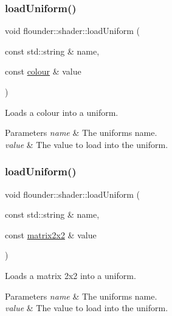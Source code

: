 \subsubsection{\texorpdfstring{load\+Uniform()}{loadUniform()}\hspace{0.1cm}{\footnotesize\ttfamily [7/13]}}
{\footnotesize\ttfamily void flounder\+::shader\+::load\+Uniform (\begin{DoxyParamCaption}\item[{const std\+::string \&}]{name,  }\item[{const \hyperlink{classflounder_1_1colour}{colour} \&}]{value }\end{DoxyParamCaption})}



Loads a colour into a uniform. 


\begin{DoxyParams}{Parameters}
{\em name} & The uniforms name. \\
\hline
{\em value} & The value to load into the uniform. \\
\hline
\end{DoxyParams}
\mbox{\label{classflounder_1_1shader_a257fff86a8d24c657724fa14ac0ef12e}} 
\subsubsection{\texorpdfstring{load\+Uniform()}{loadUniform()}\hspace{0.1cm}{\footnotesize\ttfamily [8/13]}}
{\footnotesize\ttfamily void flounder\+::shader\+::load\+Uniform (\begin{DoxyParamCaption}\item[{const std\+::string \&}]{name,  }\item[{const \hyperlink{classflounder_1_1matrix2x2}{matrix2x2} \&}]{value }\end{DoxyParamCaption})}



Loads a matrix 2x2 into a uniform. 


\begin{DoxyParams}{Parameters}
{\em name} & The uniforms name. \\
\hline
{\em value} & The value to load into the uniform. \\
\hline
\end{DoxyParams}
\mbox{\label{classflounder_1_1shader_a9122d8bd4e63275b640e43d04f75fa88}} 
